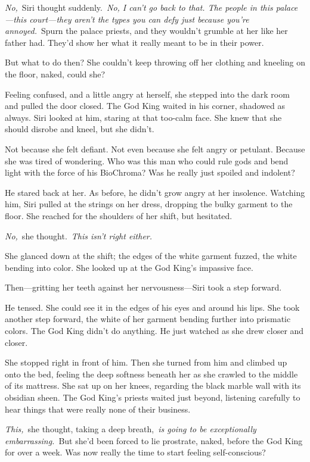 \textit{No,}~Siri thought suddenly.~\textit{No, I can’t go back to that. The people in this palace—this court—they aren’t the types you can defy just because you’re annoyed.}~Spurn the palace priests, and they wouldn’t grumble at her like her father had. They’d show her what it really meant to be in their power.

But what to do then? She couldn’t keep throwing off her clothing and kneeling on the floor, naked, could she?

Feeling confused, and a little angry at herself, she stepped into the dark room and pulled the door closed. The God King waited in his corner, shadowed as always. Siri looked at him, staring at that too-calm face. She knew that she should disrobe and kneel, but she didn’t.

Not because she felt defiant. Not even because she felt angry or petulant. Because she was tired of wondering. Who was this man who could rule gods and bend light with the force of his BioChroma? Was he really just spoiled and indolent?

He stared back at her. As before, he didn’t grow angry at her insolence. Watching him, Siri pulled at the strings on her dress, dropping the bulky garment to the floor. She reached for the shoulders of her shift, but hesitated.

\textit{No,}~she thought.~\textit{This isn’t right either.}

She glanced down at the shift; the edges of the white garment fuzzed, the white bending into color. She looked up at the God King’s impassive face.

Then—gritting her teeth against her nervousness—Siri took a step forward.

He tensed. She could see it in the edges of his eyes and around his lips. She took another step forward, the white of her garment bending further into prismatic colors. The God King didn’t do anything. He just watched as she drew closer and closer.

She stopped right in front of him. Then she turned from him and climbed up onto the bed, feeling the deep softness beneath her as she crawled to the middle of its mattress. She sat up on her knees, regarding the black marble wall with its obsidian sheen. The God King’s priests waited just beyond, listening carefully to hear things that were really none of their business.

\textit{This,}~she thought, taking a deep breath,~\textit{is going to be exceptionally embarrassing.}~But she’d been forced to lie prostrate, naked, before the God King for over a week. Was now really the time to start feeling self-conscious?

